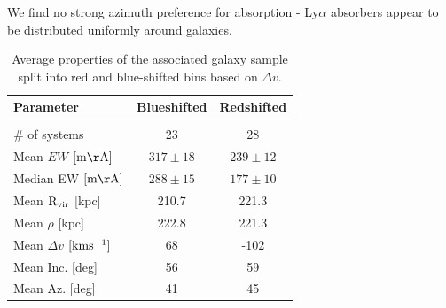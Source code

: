 \documentclass[iop]{emulateapj-rtx4}
\begin{document}
\indent \textbullet \indent We find no strong azimuth preference for absorption - Ly$\alpha$ absorbers appear to be distributed uniformly around galaxies.


\begin{table}[ht]\footnotesize
\begin{center}
\begin{tabular}{l c c}
 \hline \hline
 Parameter                				&  Blueshifted   &     Redshifted        \\ 
  \hline \hline \\
  
 \# of systems          			 		&     	23				&	28			\\
 Mean $EW$    \scriptsize $\rm [m\AA]$    &	$317 \pm 18$ 		&	$239 \pm 12$  	\\
 Median EW     \scriptsize $\rm [m\AA]$    & 	$288 \pm 15$		& 	$177 \pm 10$	\\
 Mean $\rm R_{vir}$   \scriptsize [kpc]	&   	210.7			& 	221.3   		\\
 Mean $\rho$   \scriptsize [kpc]          		&   	222.8			& 	221.3		\\
 Mean $\Delta v$  \scriptsize $\rm [km s^{-1}]$     &	68				&	-102 			\\
 Mean Inc.  \scriptsize [deg]  			&  	56				&	59			\\
 Mean Az.  \scriptsize [deg]    			&	41				&	45			\\
   
\hline
\end{tabular}
\end{center}
  \caption{\small{Average properties of the associated galaxy sample split into red and blue-shifted bins based on $\Delta v$.}}
  \label{resultsTable}
\end{table}


\nocite{*}


\end{document}
